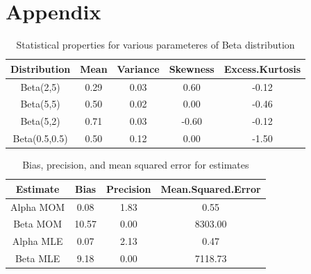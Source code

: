 \documentclass{article}\usepackage[]{graphicx}\usepackage[]{xcolor}
\begin{document}
\newpage
\onecolumn
\section{Appendix}

\begin{table}[ht]
\centering
\begin{tabular}{|c|c|c|c|c|}
  \hline
Distribution & Mean & Variance & Skewness & Excess.Kurtosis \\ 
  \hline
Beta(2,5) & 0.29 & 0.03 & 0.60 & -0.12 \\ 
  Beta(5,5) & 0.50 & 0.02 & 0.00 & -0.46 \\ 
  Beta(5,2) & 0.71 & 0.03 & -0.60 & -0.12 \\ 
  Beta(0.5,0.5) & 0.50 & 0.12 & 0.00 & -1.50 \\ 
   \hline
\end{tabular}
\caption{Statistical properties for various parameteres of Beta distribution} 
\label{statsProperties.tab}
\end{table}


\begin{table}[ht]
\centering
\begin{tabular}{|c|c|c|c|}
  \hline
Estimate & Bias & Precision & Mean.Squared.Error \\ 
  \hline
Alpha MOM & 0.08 & 1.83 & 0.55 \\ 
  Beta MOM & 10.57 & 0.00 & 8303.00 \\ 
  Alpha MLE & 0.07 & 2.13 & 0.47 \\ 
  Beta MLE & 9.18 & 0.00 & 7118.73 \\ 
   \hline
\end{tabular}
\caption{Bias, precision, and mean squared error for estimates} 
\label{precision.tab}
\end{table}
\end{document}
